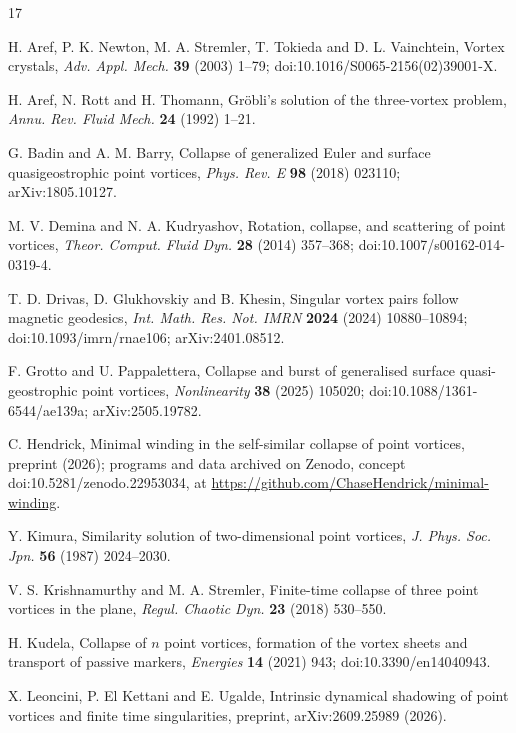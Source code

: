 \documentclass[11pt]{article}
\theoremstyle{definition}
\begin{document}
\begin{thebibliography}{17}
\small

 H. Aref, P. K. Newton, M. A. Stremler, T. Tokieda and D. L. Vainchtein, Vortex crystals, \emph{Adv. Appl. Mech.} \textbf{39} (2003) 1--79; doi:10.1016/S0065-2156(02)39001-X.

 H. Aref, N. Rott and H. Thomann, Gr\"obli's solution of the three-vortex problem, \emph{Annu. Rev. Fluid Mech.} \textbf{24} (1992) 1--21.

 G. Badin and A. M. Barry, Collapse of generalized Euler and surface quasigeostrophic point vortices, \emph{Phys. Rev. E} \textbf{98} (2018) 023110; arXiv:1805.10127.

 M. V. Demina and N. A. Kudryashov, Rotation, collapse, and scattering of point vortices, \emph{Theor. Comput. Fluid Dyn.} \textbf{28} (2014) 357--368; doi:10.1007/s00162-014-0319-4.

 T. D. Drivas, D. Glukhovskiy and B. Khesin, Singular vortex pairs follow magnetic geodesics, \emph{Int. Math. Res. Not. IMRN} \textbf{2024} (2024) 10880--10894; doi:10.1093/imrn/rnae106; arXiv:2401.08512.

 F. Grotto and U. Pappalettera, Collapse and burst of generalised surface quasi-geostrophic point vortices, \emph{Nonlinearity} \textbf{38} (2025) 105020; doi:10.1088/1361-6544/ae139a; arXiv:2505.19782.

 C. Hendrick, Minimal winding in the self-similar collapse of point vortices, preprint (2026); programs and data archived on Zenodo, concept doi:10.5281/zenodo.22953034, at \url{https://github.com/ChaseHendrick/minimal-winding}.

 Y. Kimura, Similarity solution of two-dimensional point vortices, \emph{J. Phys. Soc. Jpn.} \textbf{56} (1987) 2024--2030.

 V. S. Krishnamurthy and M. A. Stremler, Finite-time collapse of three point vortices in the plane, \emph{Regul. Chaotic Dyn.} \textbf{23} (2018) 530--550.

 H. Kudela, Collapse of $n$ point vortices, formation of the vortex sheets and transport of passive markers, \emph{Energies} \textbf{14} (2021) 943; doi:10.3390/en14040943.

 X. Leoncini, P. El Kettani and E. Ugalde, Intrinsic dynamical shadowing of point vortices and finite time singularities, preprint, arXiv:2609.25989 (2026).


\end{thebibliography}
\end{document}

